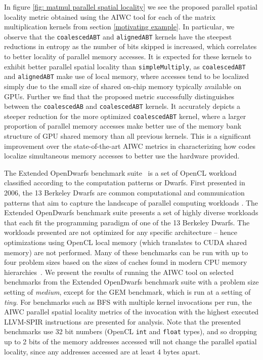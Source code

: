 \documentclass[review=false, sigchi]{acmart}
\begin{document}
	In figure \ref{fig: matmul parallel spatial locality} we see the proposed parallel spatial locality metric obtained using the AIWC tool for each of the matrix multiplication kernels from section \ref{motivating example}.
	In particular, we observe that the \texttt{coalescedABT} and \texttt{alignedABT} kernels have the steepest reductions in entropy as the number of bits skipped is increased, which correlates to better locality of parallel memory accesses.
	It is expected for these kernels to exhibit better parallel spatial locality than \texttt{simpleMultiply}, as \texttt{coalescedABT} and \texttt{alignedABT} make use of local memory, where accesses tend to be localized simply due to the small size of shared on-chip memory typically available on GPUs.
	Further we find that the proposed metric successfully distinguishes between the \texttt{coalescedAB} and \texttt{coalescedABT} kernels.
	It accurately depicts a steeper reduction for the more optimized \texttt{coalescedABT} kernel, where a larger proportion of parallel memory accesses make better use of the memory bank structure of GPU shared memory than all previous kernels.
	This is a significant improvement over the state-of-the-art AIWC metrics in characterizing how codes localize simultaneous memory accesses to better use the hardware provided.
	
	The Extended OpenDwarfs benchmark suite~\cite{johnston18opendwarfs, krommydas2016opendwarfs} is a set of OpenCL workload classified according to the computation patterns or Dwarfs. 
	First presented in 2006, the 13 Berkeley Dwarfs are common computational and communication patterns that aim to capture the landscape of parallel computing workloads \cite{asanovic2006landscape}. 
	The Extended OpenDwarfs benchmark suite presents a set of highly diverse workloads that each fit the programming paradigm of one of the 13 Berkeley Dwarfs.
	The workloads presented are not optimized for any specific architecture -- hence optimizations using OpenCL local memory (which translates to CUDA shared memory) are not performed. 
	Many of these benchmarks can be run with up to four problem sizes based on the sizes of caches found in modern CPU memory hierarchies~\cite{johnston18opendwarfs}.
	We present the results of running the AIWC tool on selected benchmarks from the Extended OpenDwarfs benchmark suite \cite{opendwarfs2020head,johnston18opendwarfs} with a problem size setting of \emph{medium}, except for the GEM benchmark, which is run at a setting of \emph{tiny}.
	For benchmarks such as BFS with multiple kernel invocations per run, the AIWC parallel spatial locality metrics of the invocation with the highest executed LLVM-SPIR instructions are presented for analysis. Note that the presented benchmarks use 32 bit numbers (OpenCL \texttt{int} and \texttt{float} types), and so dropping up to 2 bits of the memory addresses accessed will not change the parallel spatial locality, since any addresses accessed are at least 4 bytes apart.
	
\end{document}
